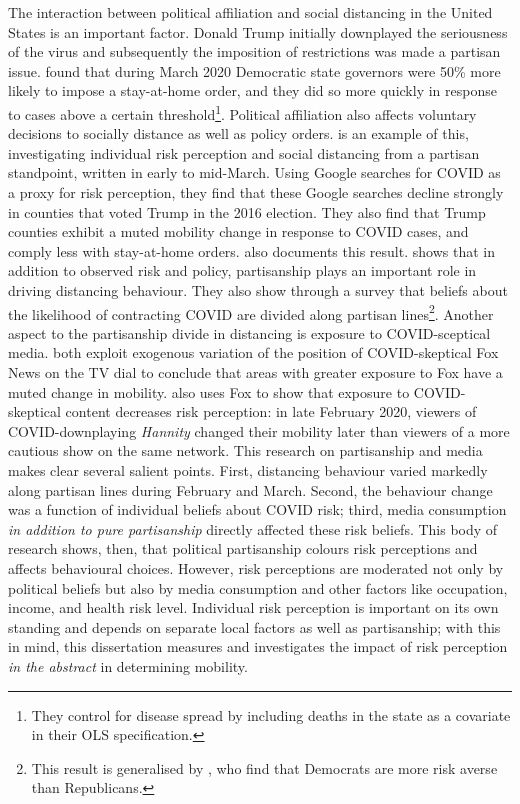\documentclass[12pt,a4]{article}
\begin{document}
The interaction between political affiliation and social distancing in the United States is an important factor. Donald Trump initially downplayed the seriousness of the virus and subsequently the imposition of restrictions was made a partisan issue. \textcite{bacciniExplainingGovernorsResponse2021} found that during March 2020 Democratic state governors were 50\% more likely to impose a stay-at-home order, and they did so more quickly in response to cases above a certain threshold\footnote{They control for disease spread by including deaths in the state as a covariate in their OLS specification.}.  Political affiliation also affects voluntary decisions to socially distance as well as policy orders.  \textcite{barriosRiskPerceptionLens2020} is an example of this, investigating individual risk perception and social distancing from a partisan standpoint, written in early to mid-March. Using Google searches for COVID as a proxy for risk perception, they find that these Google searches decline strongly in counties that voted Trump in the 2016 election. They also find that Trump counties exhibit a muted mobility change in response to COVID cases, and comply less with stay-at-home orders. \textcite{painterPoliticalBeliefsAffect2020} also documents this result. \textcite{allcottPolarizationPublicHealth2020} shows that in addition to observed risk and policy, partisanship plays an important role in driving distancing behaviour. They also show through a survey that beliefs about the likelihood of contracting COVID are divided along partisan lines\footnote{This result is generalised by \textcite{pastorPoliticalCyclesStock2020}, who find that Democrats are more risk averse than Republicans.}.  Another aspect to the partisanship divide in distancing is exposure to COVID-sceptical media. \textcite{simonovPersuasiveEffectFox2020,ananyevSafestTimeFly2020} both exploit exogenous variation of the position of COVID-skeptical Fox News on the TV dial to conclude that areas with greater exposure to Fox have a muted change in mobility. \textcite{bursztynMisinformationPandemic2020} also uses Fox to show that exposure to COVID-skeptical content decreases risk perception: in late February 2020, viewers of COVID-downplaying \textit{Hannity} changed their mobility later than viewers of a more cautious show on the same network. This research on partisanship and media makes clear several salient points. First, distancing behaviour varied markedly along partisan lines during February and March. Second, the behaviour change was a function of individual beliefs about COVID risk; third, media consumption \textit{in addition to pure partisanship} directly affected these risk beliefs. This body of research shows, then, that political partisanship colours risk perceptions and affects behavioural choices. However, risk perceptions are moderated not only by political beliefs but also by media consumption and other factors like occupation, income, and health risk level. Individual risk perception is important on its own standing and depends on separate local factors as well as partisanship; with this in mind, this dissertation measures and investigates the impact of risk perception \textit{in the abstract} in determining mobility. 
\end{document}
